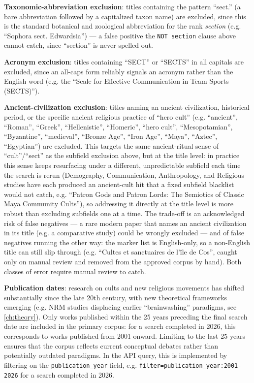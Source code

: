 \textbf{Taxonomic-abbreviation exclusion}: titles containing the pattern \enquote{sect.} (a bare abbreviation followed by a capitalized taxon name) are excluded, since this is the standard botanical and zoological abbreviation for the rank \emph{section} (e.g. \enquote{Sophora sect. Edwardsia}) — a false positive the \texttt{NOT section} clause above cannot catch, since \enquote{section} is never spelled out.

\textbf{Acronym exclusion}: titles containing \enquote{SECT} or \enquote{SECTS} in all capitals are excluded, since an all-caps form reliably signals an acronym rather than the English word (e.g. the \enquote{Scale for Effective Communication in Team Sports (SECTS)}).

\textbf{Ancient-civilization exclusion}: titles naming an ancient civilization, historical period, or the specific ancient religious practice of \enquote{hero cult} (e.g. \enquote{ancient}, \enquote{Roman}, \enquote{Greek}, \enquote{Hellenistic}, \enquote{Homeric}, \enquote{hero cult}, \enquote{Mesopotamian}, \enquote{Byzantine}, \enquote{medieval}, \enquote{Bronze Age}, \enquote{Iron Age}, \enquote{Maya}, \enquote{Aztec}, \enquote{Egyptian}) are excluded. This targets the same ancient-ritual sense of \enquote{cult}/\enquote{sect} as the subfield exclusion above, but at the title level: in practice this sense keeps resurfacing under a different, unpredictable subfield each time the search is rerun (Demography, Communication, Anthropology, and Religious studies have each produced an ancient-cult hit that a fixed subfield blacklist would not catch, e.g. \enquote{Patron Gods and Patron Lords: The Semiotics of Classic Maya Community Cults}), so addressing it directly at the title level is more robust than excluding subfields one at a time. The trade-off is an acknowledged risk of false negatives — a rare modern paper that names an ancient civilization in its title (e.g. a comparative study) could be wrongly excluded — and of false negatives running the other way: the marker list is English-only, so a non-English title can still slip through (e.g. \enquote{Cultes et sanctuaires de l'île de Cos}, caught only on manual review and removed from the approved corpus by hand). Both classes of error require manual review to catch.

\textbf{Publication dates}: research on cults and new religious movements has shifted substantially since the late 20th century, with new theoretical frameworks emerging (e.g. NRM studies displacing earlier \enquote{brainwashing} paradigms, see \ref{ch:theory}). Only works published within the 25 years preceding the final search date are included in the primary corpus: for a search completed in 2026, this corresponds to works published from 2001 onward. Limiting to the last 25 years ensures that the corpus reflects current conceptual debates rather than potentially outdated paradigms. In the API query, this is implemented by filtering on the \texttt{publication\_year} field, e.g. \verb+filter=publication_year:2001-2026+ for a search completed in 2026.

